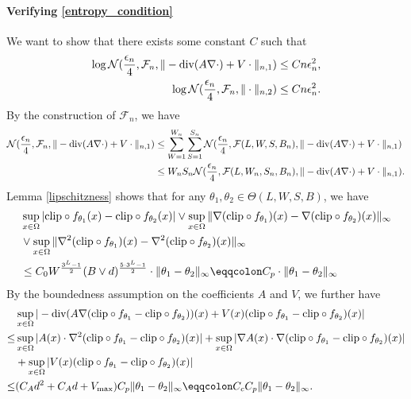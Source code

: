 \documentclass{article}
\newcommand{\F}{\mathcal{F}}
\newcommand{\N}{\mathcal{N}}
\newcommand{\clip}{\textnormal{clip}}
\renewcommand{\div}{\textnormal{div}}
\theoremstyle{plain}
\theoremstyle{definition}
\theoremstyle{remark}
\begin{document}
\paragraph{Verifying \eqref{entropy_condition}} We want to show that there exists some constant $C$ such that
\begin{align*}
     \begin{split}
          \log \N(\frac{\epsilon_n}{4}, \F_n, \|-\div (A \nabla\cdot) + V \cdot \|_{n, 1}) \leq C n \epsilon_n^2, \\
          \log \N(\frac{\epsilon_n}{4}, \F_n, \|\cdot\|_{n, 2}) \leq C n \epsilon_n^2.
    \end{split}
     \end{align*}
By the construction of $\F_n$, we have 
\begin{equation} \label{entropy_condition_label1}
\begin{aligned}
    \N(\frac{\epsilon_n}{4}, \F_n, \|-\div (A \nabla\cdot) + V \cdot \|_{n, 1}) & \leq \sum_{W =1}^{W_n} \sum_{S=1}^{S_n} \N(\frac{\epsilon_n}{4}, \F(L, W, S, B_n), \|-\div (A \nabla\cdot) + V \cdot \|_{n, 1}) \\ & \leq W_n S_n \N(\frac{\epsilon_n}{4}, \F(L, W_n, S_n, B_n), \|-\div (A \nabla\cdot) + V \cdot \|_{n, 1}).
\end{aligned}
\end{equation}
Lemma \ref{lipschitzness} shows that for any $\theta_1, \theta_2 \in \Theta(L, W, S, B)$, we have 
\begin{equation} \label{def_cp}
    \begin{aligned}
    & \sup_{x \in \Omega} |\clip \circ f_{\theta_1}(x) - \clip \circ f_{\theta_2}(x)| \vee \sup_{x \in \Omega} \|\nabla (\clip \circ f_{\theta_1})(x) - \nabla (\clip \circ f_{\theta_2})(x)\|_\infty  \\ & \vee \sup_{x \in \Omega}\|\nabla^2 (\clip \circ f_{\theta_1})(x) - \nabla^2 (\clip \circ f_{\theta_2})(x) \|_{\infty} \\  & \leq C_0  W^{\frac{3^{L}-1}{2}} (B \vee d)^{\frac{5 \cdot 3^{L}-1}{2}} \cdot \|\theta_1 - \theta_2\|_\infty \eqqcolon C_p \cdot \|\theta_1 - \theta_2\|_\infty
\end{aligned}
\end{equation}
By the boundedness assumption on the coefficients $A$ and $V$, we further have 
\begin{equation}\label{def_cc}
    \begin{aligned}
    & \sup_{x \in \Omega} |-\div (A \nabla (\clip \circ f_{\theta_1}- \clip \circ f_{\theta_2}))(x) + V(x) (\clip \circ f_{\theta_1} - \clip \circ f_{\theta_2})(x)| \\
     \leq & \sup_{x \in \Omega} |A(x) \cdot \nabla^2 (\clip \circ f_{\theta_1}- \clip \circ f_{\theta_2})(x)| + \sup_{x \in \Omega} |\nabla A(x) \cdot \nabla (\clip \circ f_{\theta_1}- \clip \circ f_{\theta_2})(x)| \\
     & + \sup_{x \in \Omega} |V(x) (\clip \circ f_{\theta_1}- \clip \circ f_{\theta_2})(x)|\\
     \leq & (C_A d^2 + C_A d + V_{\text{max}}) C_p \|\theta_1 - \theta_2\|_\infty \eqqcolon C_c C_p \|\theta_1 - \theta_2\|_\infty. 
\end{aligned}
\end{equation}
\end{document}
